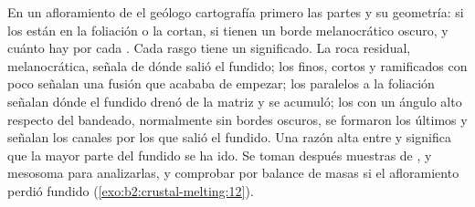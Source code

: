 \begin{inthefield}
En un afloramiento de  el geólogo cartografía primero las partes y su geometría: si los
 están en la foliación o la cortan, si tienen un borde melanocrático oscuro,
y cuánto  hay por cada . Cada rasgo tiene un significado. La roca residual,
melanocrática, señala de dónde salió el fundido; los  finos, cortos y ramificados con
poco  señalan una fusión que acababa de empezar; los  paralelos a la foliación
señalan dónde el fundido drenó de la matriz y se acumuló; los  con un ángulo alto respecto del
bandeado, normalmente sin bordes oscuros, se formaron los últimos y señalan los canales por los que
salió el fundido. Una razón alta entre  y  significa que la mayor parte del fundido se ha ido.
Se toman después muestras de ,  y mesosoma para analizarlas, y comprobar por balance
de masas si el afloramiento perdió fundido (\cref{exo:b2:crustal-melting:12}).
\end{inthefield}

